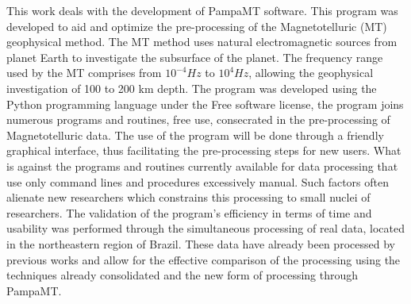 \documentclass[12pt,twoside,oneright,a4paper,chapter=TITLE,english,brazil]{unipampa}
\begin{document}
\begin{resumoingles}
This work deals with the development of PampaMT software. This program was developed to aid and optimize the pre-processing of the Magnetotelluric (MT) geophysical method. The MT method uses natural electromagnetic sources from planet Earth to investigate the subsurface of the planet. The frequency range used by the MT comprises from $10^{-4} Hz$ to $10^{4} Hz$, allowing the geophysical investigation of 100 to 200 km depth. The program was developed using the Python programming language under the Free software license, the program joins numerous programs and routines, free use, consecrated in the pre-processing of Magnetotelluric data. The use of the program will be done through a friendly graphical interface, thus facilitating the pre-processing steps for new users. What is against the programs and routines currently available for data processing that use only command lines and procedures excessively manual. Such factors often alienate new researchers which constrains this processing to small nuclei of researchers. The validation of the program's efficiency in terms of time and usability was performed through the simultaneous processing of real data, located in the northeastern region of Brazil. These data have already been processed by previous works and allow for the effective comparison of the processing using the techniques already consolidated and the new form of processing through PampaMT.
\end{resumoingles}


\listoffigures      %
\end{document}
